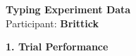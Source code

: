 \documentclass[10pt,a4paper]{article}
\begin{document}

\begin{center}
    {\Large\bfseries Typing Experiment Data}\\
    \vspace{2pt}
    Participant: \textbf{Brittick}
\end{center}

\vspace{0.25cm}


\noindent
{\large\bfseries 1. Trial Performance}

\vspace{0.08cm}
\end{document}
